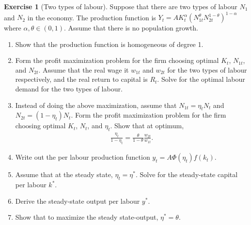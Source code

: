 \documentclass{book}
\theoremstyle{definition}
\newtheorem{exercise}{Exercise}[chapter]
\theoremstyle{plain}
\begin{document}
\begin{exercise}[Two types of labour]
    Suppose that there are two types of labour $N_1$ and $N_2$ in the economy. The production function is $Y_t = A K_t^{\alpha} \left(N_{1t}^{\theta} N_{2t}^{1-\theta}\right)^{1-\alpha}$ where $\alpha, \theta \in (0,1)$. Assume that there is no population growth.
    \begin{enumerate}[label=(\arabic*)]
       \item Show that the production function is homogeneous of degree 1.
       \item Form the profit maximization problem for the firm choosing optimal $K_t$, $N_{1t}$, and $N_{2t}$. Assume that the real wage it $w_{1t}$ and $w_{2t}$ for the two types of labour respectively, and the real return to capital is $R_t$. Solve for the optimal labour demand for the two types of labour.
       \item Instead of doing the above maximization, assume that $N_{1t} = \eta_t N_t$ and $N_{2t} = (1-\eta_t) N_t$. Form the profit maximization problem for the firm choosing optimal $K_t$, $N_t$, and $\eta_t$. Show that at optimum,
       \begin{align*}
           \frac{\eta_t}{1-\eta_t} = \frac{\theta}{1-\theta} \frac{w_{2t}}{w_{1t}}.
       \end{align*}
       \item Write out the per labour production function $y_t = A \Phi(\eta_t)f(k_t)$. 
       \item Assume that at the steady state, $\eta_t = \eta^*$. Solve for the steady-state capital per labour $k^*$. 
       \item Derive the steady-state output per labour $y^*$.
       \item Show that to maximize the steady state-output, $\eta^* = \theta$.
    \end{enumerate}
\end{exercise}
\end{document}
